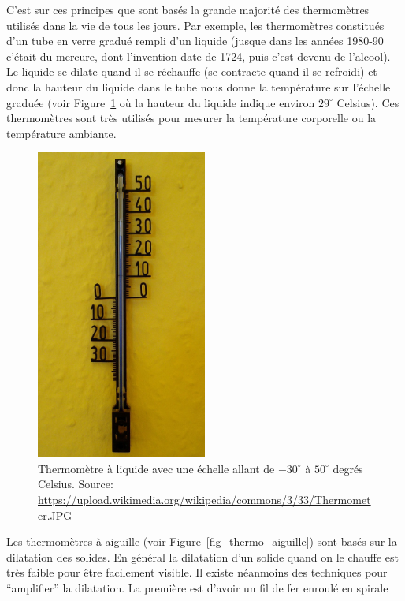 \documentclass[a4paper,12pt]{book}
\begin{document}
C'est sur ces principes que sont basés la grande majorité des
thermomètres utilisés dans la vie de tous les jours. Par 
exemple, les thermomètres constitués d'un tube en verre gradué 
rempli d'un liquide (jusque dans les années 1980-90 c'était du mercure, dont l'invention date de 1724, puis c'est devenu de l'alcool). Le liquide se dilate quand il se réchauffe (se contracte quand il se refroidi) et 
donc la hauteur du liquide dans le tube nous donne la température sur l'échelle graduée (voir Figure~\ref{fig_thermo_liquide} où la hauteur du liquide indique environ $29^\circ$ Celsius). Ces thermomètres sont très utilisés pour mesurer la température corporelle ou la température ambiante.
\begin{figure}
\begin{center}
\includegraphics[width=0.5\textwidth]{figs/Thermometer.JPG}
\caption{Thermomètre à liquide avec une échelle allant de $-30^\circ$ à $50^\circ$ degrés Celsius. Source: \url{https://upload.wikimedia.org/wikipedia/commons/3/33/Thermometer.JPG}}
\label{fig_thermo_liquide}
\end{center}
\end{figure} 
Les thermomètres à aiguille (voir Figure~\ref{fig_thermo_aiguille}) sont basés sur la dilatation des solides. 
En général la dilatation d'un solide quand on le chauffe est très faible pour être facilement
visible. Il existe néanmoins des techniques pour ``amplifier'' la dilatation. La première est d'avoir un fil de fer enroulé en spirale 
\end{document}
